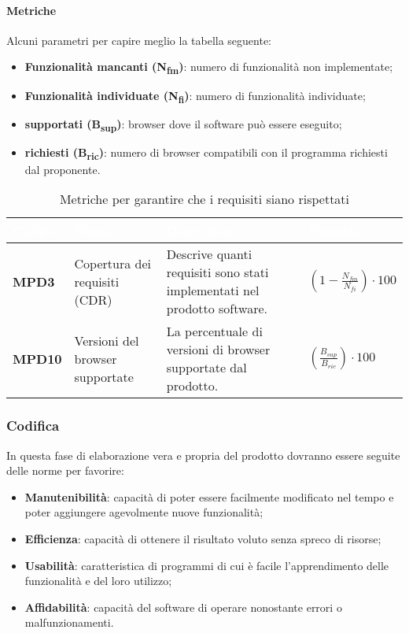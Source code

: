 \paragraph{Metriche}
Alcuni parametri per capire meglio la tabella seguente:
\begin{itemize}
\item \textbf{Funzionalità mancanti (N\textsubscript{fm})}: numero di funzionalità non implementate;
\item \textbf{Funzionalità individuate (N\textsubscript{fi})}: numero di funzionalità individuate;
\item \textbf{ supportati (B\textsubscript{sup})}: browser dove il software può essere eseguito;
	\item \textbf{ richiesti (B\textsubscript{ric})}: numero di browser compatibili con il programma richiesti dal proponente.
\end{itemize}
\renewcommand{\arraystretch}{1.5}
\renewcommand\extrarowheight{1.5pt}
\begin{longtable}{C{1.5cm} C{4.5cm} C{5.5cm} C{5cm}}
		\textcolor{white}{\textbf{Codice}} & 
		\textcolor{white}{\textbf{Nome}} & 
		\textcolor{white}{\textbf{Descrizione}} & 
		\textcolor{white}{\textbf{Formula}} \\
		\endfirsthead
	    \endfoot
	    \caption{Metriche per garantire che i requisiti siano rispettati}
	    \endlastfoot
		\hline
		\textbf{MPD3} & 
		Copertura dei requisiti (CDR) & 
		Descrive quanti requisiti sono stati implementati nel prodotto software. &
		$(1 - \frac{N_{fm}}{N_{fi}}) \cdot 100 $ \\
		\textbf{MPD10} & 
		Versioni del browser supportate & 
		La percentuale di versioni di browser supportate dal prodotto. &
		$(\frac{B_{sup}}{B_{ric}}) \cdot 100 $  \\
\end{longtable} 
\subsubsection{Codifica}
In questa fase di elaborazione vera e propria del prodotto dovranno essere seguite delle norme per favorire:
\begin{itemize}
\item \textbf{Manutenibilità}: capacità di poter essere facilmente modificato nel tempo e poter aggiungere agevolmente nuove funzionalità;
\item \textbf{Efficienza}: capacità di ottenere il risultato voluto senza spreco di risorse;
\item \textbf{Usabilità}: caratteristica di programmi di cui è facile l'apprendimento delle funzionalità e del loro utilizzo;
\item \textbf{Affidabilità}: capacità del software di operare nonostante errori o malfunzionamenti. 
\end{itemize}
